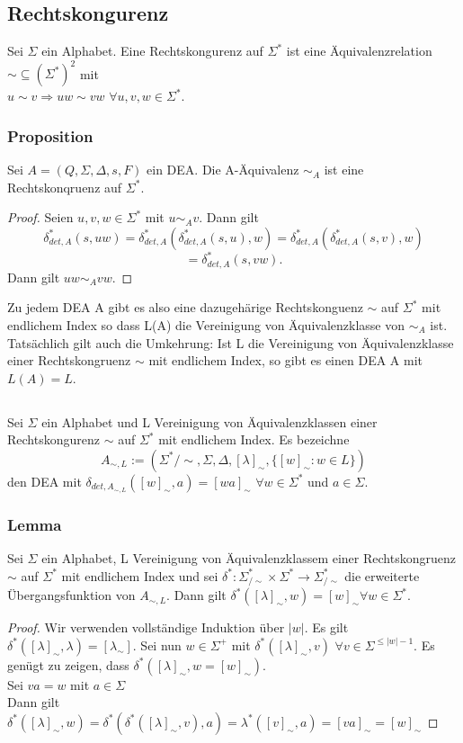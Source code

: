 \subsection{Rechtskongurenz}
    Sei \(\Sigma\) ein Alphabet. Eine Rechtskongurenz auf \(\Sigma^*\) ist eine Äquivalenzrelation
    \(\sim\subseteq(\Sigma^*)^2\) mit \\
    \(u\sim v\Rightarrow uw\sim vw\) \(\forall u,v,w\in\Sigma^*\).
    \subsubsection*{Proposition}
    Sei $A = (Q, \Sigma, \Delta, s, F)$ ein DEA. Die A-Äquivalenz $\sim_{A}$ ist eine Rechtskonqruenz auf $\Sigma^{*}$.
        \begin{proof}
          Seien $u, v, w \in \Sigma^{*}$ mit $u \sim_{A} v$. Dann gilt 
          \[\delta_{det, A}^{*}(s, uw) = \delta_{det,A}^{*}(\delta_{det,A}^{*}(s, u), w) = \delta_{det,A}^{*}(\delta_{det,A}^{*}(s,v), w)\]
          \[= \delta_{det,A}^{*}(s, vw).\]
          Dann gilt $uw\sim_{A}vw.$    
        \end{proof} 
        Zu jedem DEA A gibt es also eine dazugehärige Rechtskonguenz $\sim$ auf $\Sigma^{*}$ mit endlichem Index so dass L(A) die Vereinigung von Äquivalenzklasse von $\sim_{A}$ ist. Tatsächlich gilt auch die Umkehrung: Ist L die Vereinigung von Äquivalenzklasse einer Rechtskongruenz $\sim$ mit endlichem Index, so gibt es einen DEA A mit $L(A) = L$.
\subsection{}
    Sei \(\Sigma\) ein Alphabet und L Vereinigung von Äquivalenzklassen einer Rechtskongurenz \(\sim\)
    auf \(\Sigma^*\) mit endlichem Index. Es bezeichne 
    \[A_{\sim,L}:=(\Sigma^*/{\sim},\Sigma,\Delta,[\lambda]_\sim,\{[w]_\sim:w\in L\})\]
    den DEA mit \(\delta_{det,A_{\sim,L}}([w]_\sim,a)=[wa]_\sim\) \(\forall w\in\Sigma^*\) und \(a\in\Sigma\).
    \subsubsection*{Lemma}
    Sei $\Sigma$ ein Alphabet, L Vereinigung von Äquivalenzklassem einer Rechtskongruenz $\sim$ auf $\Sigma^{*}$ mit endlichem Index und sei $\delta^{*} : \Sigma^{*}_{/\sim} \times \Sigma^{*} \rightarrow \Sigma^{*}_{/\sim}$ die erweiterte Übergangsfunktion von $A_{\sim, L}$. Dann gilt $\delta^{*}([\lambda]_{\sim}, w) = [w]_{\sim} \forall w \in \Sigma^{*}$. 
\begin{proof}
  Wir verwenden vollständige Induktion über $|w|$. Es gilt $\delta^{*}([\lambda]_{\sim}, \lambda) = [\lambda_{\sim}]$. Sei nun $w \in \Sigma^{+}$ mit \(\delta^*([\lambda]_\sim,v)\) \(\forall v\in\Sigma^{\leq|w|-1}\). Es genügt zu zeigen, dass \(\delta^*([\lambda]_\sim,w=[w]_\sim)\).\\
  Sei \(va=w\) mit \(a\in\Sigma\)\\
  Dann gilt \(\delta^*([\lambda]_\sim,w)=\delta^*(\delta^*([\lambda]_\sim,v),a)=\lambda^*([v]_\sim,a)=[va]_\sim=[w]_\sim\)
\end{proof}
